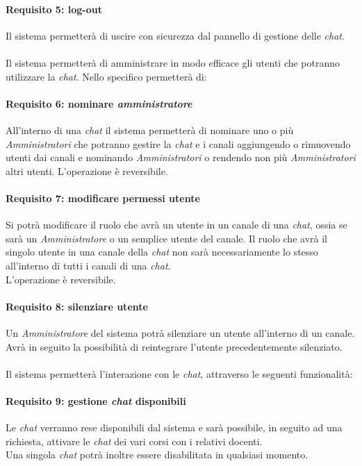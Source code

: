 \paragraph{Requisito 5: log-out\\}
Il sistema permetterà di uscire con sicurezza dal pannello di gestione delle \emph{chat}.\\
\\
Il sistema permetterà di amministrare in modo efficace gli utenti che potranno utilizzare la \emph{chat}. Nello specifico permetterà di:

\paragraph{Requisito 6: nominare \emph{amministratore}\\}
All’interno di una \emph{chat} il sistema permetterà di nominare uno o più \emph{Amministratori} che potranno gestire la \emph{chat} e i canali aggiungendo o rimuovendo utenti dai canali e nominando \emph{Amministratori} o rendendo non più \emph{Amministratori} altri utenti. L’operazione è reversibile.

\paragraph{Requisito 7: modificare permessi utente\\}
Si potrà modificare il ruolo che avrà un utente in un canale di una \emph{chat}, ossia se sarà un \emph{Amministratore} o un semplice utente del canale. Il ruolo che avrà il singolo utente in una canale della \emph{chat} non sarà necessariamente lo stesso all’interno di tutti i canali di una \emph{chat}.\\ 
L’operazione è reversibile.

\paragraph{Requisito 8: silenziare utente\\}
Un \emph{Amministratore} del sistema potrà silenziare un utente all’interno di un canale. Avrà in seguito la possibilità di reintegrare l’utente precedentemente silenziato.\\
\\
Il sistema permetterà l’interazione con le \emph{chat}, attraverso le seguenti funzionalità:

\paragraph{Requisito 9: gestione \emph{chat} disponibili\\}
Le \emph{chat} verranno rese disponibili dal sistema e sarà possibile, in seguito ad una richiesta, attivare le \emph{chat} dei vari corsi con i relativi docenti.\\ 
Una singola \emph{chat} potrà inoltre essere disabilitata in qualsiasi momento.

